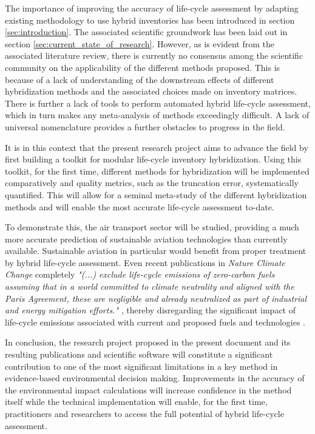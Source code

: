 \documentclass{article}
\begin{document}
    The importance of improving the accuracy of life-cycle assessment by adapting existing methodology to use hybrid inventories has been introduced in section \ref{sec:introduction}. The associated scientific groundwork has been laid out in section \ref{sec:current_state_of_research}. However, as is evident from the associated literature review, there is currently no consensus among the scientific community on the applicability of the different methods proposed. This is because of a lack of understanding of the downstream effects of different hybridization methods and the associated choices made on inventory matrices. There is further a lack of tools to perform automated hybrid life-cycle assessment, which in turn makes any meta-analysis of methods exceedingly difficult. A lack of universal nomenclature provides a further obstacles to progress in the field. 
    
    It is in this context that the present research project aims to advance the field by first building a toolkit for modular life-cycle inventory hybridization. Using this toolkit, for the first time, different methods for hybridization will be implemented comparatively and quality metrics, such as the truncation error, systematically quantified. This will allow for a seminal meta-study of the different hybridization methods and will enable the most accurate life-cycle assessment to-date.
    
    To demonstrate this, the air transport sector will be studied, providing a much more accurate prediction of sustainable aviation technologies than currently available. Sustainable aviation in particular would benefit from proper treatment by hybrid life-cycle assessment. Even recent publications in \textit{Nature Climate Change} completely \textit{"(...) exclude life-cycle emissions of zero-carbon fuels assuming that in a world committed to climate neutrality and aligned with the Paris Agreement, these are negligible and already neutralized as part of industrial and energy mitigation efforts."} \cite{brazzola_definitions_2022}, thereby disregarding the significant impact of life-cycle emissions associated with current and proposed fuels and technologies \cite{prussi_corsia_2021}.
    
    In conclusion, the research project proposed in the present document and its resulting publications and scientific software will constitute a significant contribution to one of the most significant limitations in a key method in evidence-based environmental decision making. Improvements in the accuracy of the environmental impact calculations will increase confidence in the method itself while the technical implementation will enable, for the first time, practitioners and researchers to access the full potential of hybrid life-cycle assessment.
\end{document}
